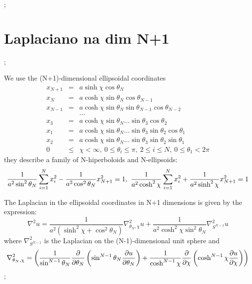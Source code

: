 \documentclass[a4paper,12pt]{article}
\begin{document}
;

\section{Laplaciano na dim N+1}

;

We use the (N+1)-dimensional ellipsoidal coordinates%
\begin{eqnarray*}
x_{N+1} &=&a\sinh \chi \cos \theta _{N} \\
x_{N} &=&a\cosh \chi \sin \theta _{N}\cos \theta _{N-1} \\
x_{N-1} &=&a\cosh \chi \sin \theta _{N}\sin \theta _{N-1}\cos \theta _{N-2}
\\
&&... \\
x_{3} &=&a\cosh \chi \sin \theta _{N}...\sin \theta _{3}\cos \theta _{2} \\
x_{1} &=&a\cosh \chi \sin \theta _{N}...\sin \theta _{3}\sin \theta _{2}\cos
\theta _{1} \\
x_{2} &=&a\cosh \chi \sin \theta _{N}...\sin \theta _{3}\sin \theta _{2}\sin
\theta _{1} \\
0 &\leq &\chi <\infty ,\ 0\leq \theta _{i}\leq \pi ,\ 2\leq i\leq N,\ 0\leq
\theta _{1}<2\pi
\end{eqnarray*}%
they describe a family of N-hiperboloids and N-ellipsoids:%
\begin{equation*}
\frac{1}{a^{2}\sin ^{2}\theta _{N}}\sum_{i=1}^{N}x_{i}^{2}-\frac{1}{%
a^{2}\cos ^{2}\theta _{N}}x_{N+1}^{2}=1,\ \frac{1}{a^{2}\cosh ^{2}\chi }%
\sum_{i=1}^{N}x_{i}^{2}+\frac{1}{a^{2}\sinh ^{2}\chi }x_{N+1}^{2}=1
\end{equation*}

The Laplacian in the ellipsoidal coordinates in N+1 dimensions is given by
the expression:%
\begin{equation*}
\nabla ^{2}u=\frac{1}{a^{2}\left( \sinh ^{2}\chi +\cos ^{2}\theta
_{N}\right) }\nabla _{\theta _{N},\chi }^{2}u+\frac{1}{a^{2}\cosh ^{2}\chi
\sin ^{2}\theta _{N}}\nabla _{S^{N-1}}^{2}u
\end{equation*}%
where $\nabla _{S^{N-1}}^{2}$ is the Laplacian on the (N-1)-dimensional unit
sphere and%
\begin{equation*}
\nabla _{\theta _{N},\chi }^{2}=\left( \frac{1}{\sin ^{N-1}\theta _{N}}\frac{%
\partial }{\partial \theta _{N}}\left( \sin ^{N-1}\theta _{N}\frac{\partial u%
}{\partial \theta _{N}}\right) +\frac{1}{\cosh ^{N-1}\chi }\frac{\partial }{%
\partial \chi }\left( \cosh ^{N-1}\chi \frac{\partial u}{\partial \chi }%
\right) \right) 
\end{equation*}%
\begin{equation*}
\end{equation*}%
;
\end{document}
